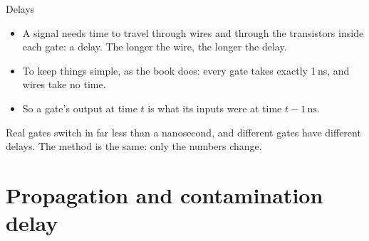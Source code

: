 \documentclass[10pt]{wosm-slides}
\begin{document}
\begin{frame}{Delays}
  \begin{itemize}
    \item A signal needs time to travel through wires and through the transistors
      inside each gate: a \alert{delay}. The longer the wire, the longer the delay.
    \item To keep things simple, as the book does: \alert{every gate takes exactly
      1\,ns}, and wires take no time.
    \item So a gate's output at time $t$ is what its inputs were at time
      $t - 1\,\mathrm{ns}$.
  \end{itemize}

  \bigskip
  \begin{remark}
    Real gates switch in far less than a nanosecond, and different gates have
    different delays. The method is the same: only the numbers change.
  \end{remark}
\end{frame}

\section{Propagation and contamination delay}
\end{document}
